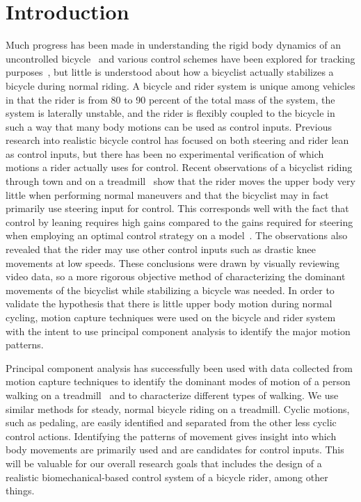 \documentclass[smallextended]{svjour3}     %
\begin{document}
\section{Introduction}
\label{intro}
Much progress has been made in understanding the rigid body dynamics of an
uncontrolled bicycle~\cite{Meijaard2007,Kooijman2008} and various control schemes have been
explored for tracking purposes~\cite{Peterson2008a,Schwab2008,Sharp2008a}, but
little is understood about how a bicyclist actually stabilizes a bicycle during
normal riding. A bicycle and rider system is unique among vehicles in
that the rider is from 80 to 90 percent of the total mass of the system, the
system is laterally unstable, and the rider is flexibly coupled to the
bicycle in such a way that many body motions can be used as control inputs.
Previous research into realistic bicycle control has focused on both steering
and rider lean as control inputs, but there has been no experimental
verification of which motions a rider actually uses for control. Recent
observations of a bicyclist riding through town and on a
treadmill~\cite{Kooijman2009a} show that the rider moves the upper body very
little when performing normal maneuvers and that the bicyclist may in fact
primarily use steering input for control. This corresponds well with the fact
that control by leaning requires high gains compared to the gains required for
steering when employing an optimal control strategy on a
model~\cite{Peterson2008a,Schwab2008,Sharp2008a}. The observations also
revealed
that the rider may use other control inputs such as drastic knee movements at
low speeds. These conclusions were drawn by visually reviewing video data, so a
more rigorous objective method of characterizing the dominant movements of the
bicyclist while stabilizing a bicycle was needed. In order to validate the
hypothesis that there is little upper body motion during normal cycling, motion
capture techniques were used on the bicycle and rider system with the intent to
use principal component analysis to identify the major motion patterns.

Principal component analysis has successfully been used with data collected
from motion capture techniques to identify the dominant modes of motion of a
person walking on a treadmill~\cite{Troje2002} and to characterize different
types of walking. We use similar methods for steady, normal bicycle riding on a
treadmill. Cyclic motions, such as pedaling, are easily identified and
separated from the other less cyclic control actions. Identifying the patterns
of movement gives insight into which body movements are primarily used and are
candidates for control inputs. This will be valuable for our overall research
goals that includes the design of a realistic
biomechanical-based control system of a bicycle rider, among other things.
\end{document}
